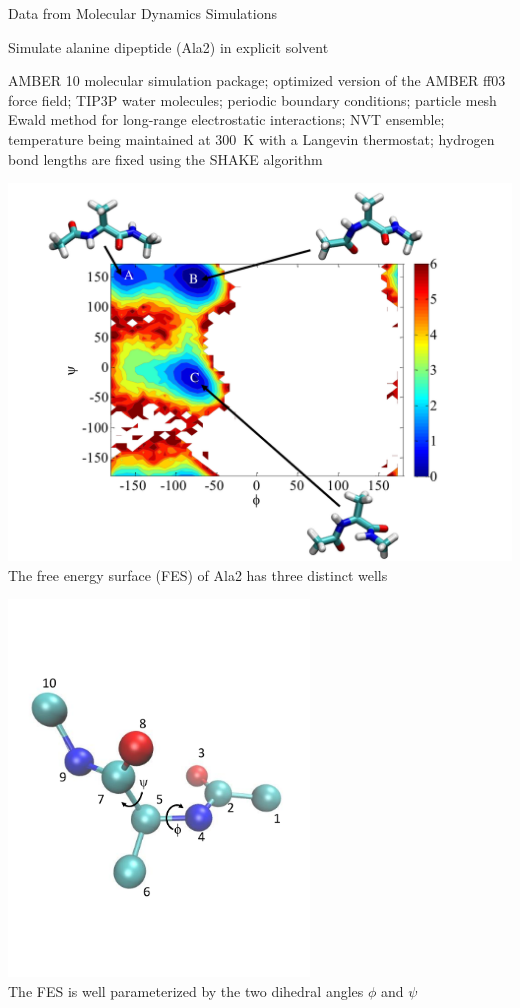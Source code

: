 \documentclass[12pt]{beamer}
\begin{document}
\begin{frame}{Data from Molecular Dynamics Simulations}

	Simulate alanine dipeptide (Ala2) in explicit solvent \\
	{\tiny AMBER 10 molecular simulation package;
    optimized version of the AMBER ff03 force field;
    TIP3P water molecules;
    periodic boundary conditions;
    particle mesh Ewald method for long-range electrostatic interactions;
    NVT ensemble;
    temperature being maintained at 300~K with a Langevin thermostat;
    hydrogen bond lengths are fixed using the SHAKE algorithm \par}
    
    \begin{minipage}[t]{0.5\textwidth}
        \centering
        \includegraphics[width=\textwidth]{FES}\\
        {\small The free energy surface (FES) of Ala2 has three distinct wells}
    \end{minipage}
    \hfill
    \begin{minipage}[t]{0.4\textwidth}
        \centering
        \includegraphics[width=0.6\textwidth]{molecule2}\\
        {\small The FES is well parameterized by the two dihedral angles $\phi$ and $\psi$}
    \end{minipage}


\end{frame}
\end{document}

